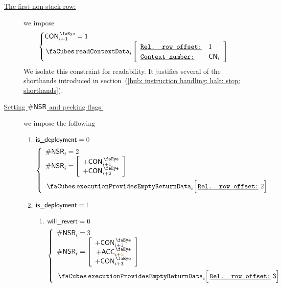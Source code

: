 \begin{description}
	\item[\underline{The first non stack row:}] we impose
		\[
			\begin{cases}
				\peekContext     _{i + 1} = 1    \\
				\readContextData {i}{1}{\cn_{i}} \\
			\end{cases}
		\]
		\saNote{} We isolate this constraint for readability. It justifies several of the shorthands introduced in section~(\ref{hub: instruction handling: halt: stop: shorthands}). 
	\item[\underline{Setting $\textsf{\#NSR}$ and peeking flags:}] we impose the following
		\begin{enumerate}
			\item \If $\textsf{is\_deployment} = 0$ \Then
				\[
					\left\{ \begin{array}{l}
						\nonStackRows_{i} = 2 \\
						\nonStackRows_{i} =
						\left[ \begin{array}{r}
							+ \peekContext_{i + 1} \\
							+ \peekContext_{i + 2} \\
						\end{array} \right]
						\vspace{2mm} \\
						\executionProvidesEmptyReturnData {i}{2} \\
					\end{array} \right.
				\]
			\item \If $\textsf{is\_deployment} = 1$ \Then 
				\begin{enumerate}
					\item \If $\textsf{will\_revert} = 0$ \Then
						\[
							\left\{ \begin{array}{l}
								\nonStackRows_{i} = 3 \\
								\nonStackRows_{i} =
								\left[ \begin{array}{r}
									+ \peekContext_{i + 1} \\
									+ \peekAccount_{i + \locFirstAccountRow} \\
									+ \peekContext_{i + 3} \\
								\end{array} \right]
								\vspace{2mm} \\
								\executionProvidesEmptyReturnData {i}{3} \\
							\end{array} \right.
\]
\end{enumerate}
\end{enumerate}
\end{description}
